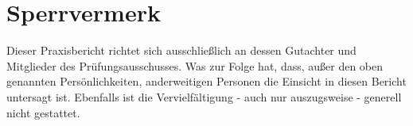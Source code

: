 
\section*{Sperrvermerk}

Dieser Praxisbericht richtet sich ausschließlich an dessen Gutachter und Mitglieder des Prüfungsausschusses. 
Was zur Folge hat, dass, außer den oben genannten Persönlichkeiten, anderweitigen Personen die Einsicht in diesen Bericht untersagt ist. Ebenfalls ist die Vervielfältigung - auch nur auszugsweise - generell nicht gestattet.
